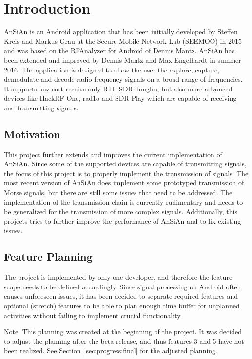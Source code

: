\chapter{Introduction}
	\ac{AnSiAn} is an Android application that has been initially developed by Steffen Kreis and Markus Grau at the Secure Mobile Network Lab (SEEMOO) in 2015 and was based on the RFAnalyzer for Android  \cite{RFAnalyzer} of Dennis Mantz. AnSiAn has been extended and improved by Dennis Mantz and Max Engelhardt in summer 2016. The application is designed to allow the user the explore, capture, demodulate and decode radio frequency signals on a broad range of frequencies. It supports low cost receive-only RTL-SDR dongles, but also more advanced devices like HackRF One, rad1o and SDR Play which are capable of receiving and transmitting signals.
	
	
\section{Motivation}
	This project further extends and improves the current implementation of \ac{AnSiAn}. Since some of the supported devices are capable of transmitting signals, the focus of this project is to properly implement the transmission of signals. The most recent version of \ac{AnSiAn} does implement some prototyped transmission of Morse signals, but there are still some issues that need to be addressed.  The implementation of the transmission chain is currently rudimentary and needs to be generalized for the transmission of more complex signals. Additionally, this projects tries to further improve the performance of \ac{AnSiAn} and to fix existing issues. 

\section{Feature Planning}
	The project is implemented by only one developer, and therefore the feature scope needs to be defined accordingly. Since signal processing on Android often causes unforeseen issues, it has been decided to separate required features and optional (stretch) features to be able to plan enough time buffer for unplanned activities without failing to implement crucial functionality. 
	
	Note: This planning was created at the beginning of the project. It was decided to adjust the planning after the beta release, and thus features 3 and 5 have not been realized. See Section~\ref{sec:progress:final} for the adjusted planning.
	
